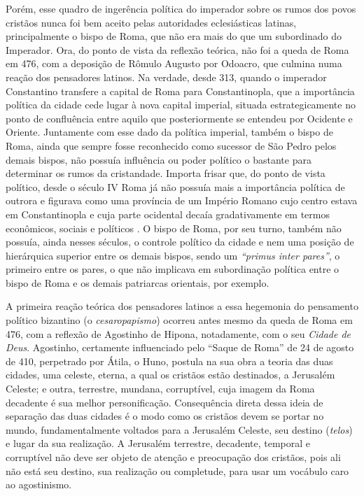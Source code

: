 Porém, esse quadro de ingerência política do imperador sobre os rumos
dos povos cristãos nunca foi bem aceito pelas autoridades eclesiásticas
latinas, principalmente o bispo de Roma, que não era mais do que um
subordinado do Imperador. Ora, do ponto de vista da reflexão teórica,
não foi a queda de Roma em 476, com a deposição de Rômulo Augusto por
Odoacro, que culmina numa reação dos pensadores latinos. Na verdade,
desde 313, quando o imperador Constantino transfere a capital de Roma
para Constantinopla, que a importância política da cidade cede lugar à
nova capital imperial, situada estrategicamente no ponto de confluência
entre aquilo que posteriormente se entendeu por Ocidente e Oriente.
Juntamente com esse dado da política imperial, também o bispo de Roma,
ainda que sempre fosse reconhecido como sucessor de São Pedro pelos
demais bispos, não possuía influência ou poder político o bastante para
determinar os rumos da cristandade. Importa frisar que, do ponto de
vista político, desde o século IV Roma já não possuía mais a importância
política de outrora e figurava como uma província de um Império Romano
cujo centro estava em Constantinopla e cuja parte ocidental decaía
gradativamente em termos econômicos, sociais e políticos . O bispo de
Roma, por seu turno, também não possuía, ainda nesses séculos, o
controle político da cidade e nem uma posição de hierárquica superior
entre os demais bispos, sendo um \emph{``primus inter pares''}, o
primeiro entre os pares, o que não implicava em subordinação política
entre o bispo de Roma e os demais patriarcas orientais, por exemplo.

A primeira reação teórica dos pensadores latinos a essa hegemonia do
pensamento político bizantino (o \emph{cesaropapismo}) ocorreu antes
mesmo da queda de Roma em 476, com a reflexão de Agostinho de Hipona,
notadamente, com o seu \emph{Cidade de Deus}. Agostinho, certamente
influenciado pelo ``Saque de Roma'' de 24 de agosto de 410, perpetrado
por Átila, o Huno, postula na sua obra a teoria das duas cidades, uma
celeste, eterna, a qual os cristãos estão destinados, a Jerusalém
Celeste; e outra, terrestre, mundana, corruptível, cuja imagem da Roma
decadente é sua melhor personificação. Consequência direta dessa ideia
de separação das duas cidades é o modo como os cristãos devem se portar
no mundo, fundamentalmente voltados para a Jerusalém Celeste, seu
destino (\emph{telos}) e lugar da sua realização. A Jerusalém terrestre,
decadente, temporal e corruptível não deve ser objeto de atenção e
preocupação dos cristãos, pois ali não está seu destino, sua realização
ou completude, para usar um vocábulo caro ao agostinismo.

